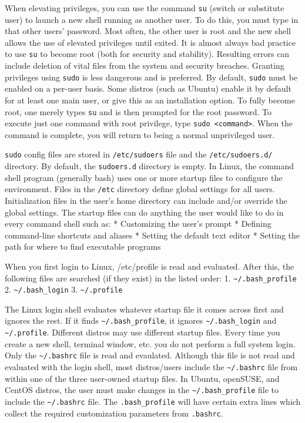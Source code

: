 When elevating privileges, you can use the command \texttt{su} (switch
or substitute user) to launch a new shell running as another user. To do
this, you must type in that other users' password. Most often, the other
user is root and the new shell allows the use of elevated privileges
until exited. It is almost always bad practice to use \texttt{su} to
become root (both for security and stability). Resulting errors can
include deletion of vital files from the system and security breaches.
Granting privileges using \texttt{sudo} is less dangerous and is
preferred. By default, \texttt{sudo} must be enabled on a per-user
basis. Some distros (such as Ubuntu) enable it by default for at least
one main user, or give this as an installation option. To fully become
root, one merely types \texttt{su} and is then prompted for the root
password. To execute just one command with root privilege, type
\texttt{sudo \textless{}command\textgreater{}}. When the command is
complete, you will return to being a normal unprivileged user.

\texttt{sudo} config files are stored in \texttt{/etc/sudoers} file and
the \texttt{/etc/sudoers.d/} directory. By default, the
\texttt{sudoers.d} directory is empty. In Linux, the command shell
program (generally bash) uses one or more startup files to configure the
environment. Files in the \texttt{/etc} directory define global settings
for all users. Initialization files in the user's home directory can
include and/or override the global settings. The startup files can do
anything the user would like to do in every command shell such as: *
Customizing the user's prompt * Defining command-line shortcuts and
aliases * Setting the default text editor * Setting the path for where
to find executable programs

When you first login to Linux, /etc/profile is read and evaluated. After
this, the following files are searched (if they exist) in the listed
order: 1. \texttt{\textasciitilde{}/.bash\_profile} 2.
\texttt{\textasciitilde{}/.bash\_login} 3.
\texttt{\textasciitilde{}/.profile}

The Linux login shell evaluates whatever startup file it comes across
first and ignores the rest. If it finds
\texttt{\textasciitilde{}/.bash\_profile}, it ignores
\texttt{\textasciitilde{}/.bash\_login} and
\texttt{\textasciitilde{}/.profile}. Different distros may use different
startup files. Every time you create a new shell, terminal window, etc.
you do not perform a full system login. Only the
\texttt{\textasciitilde{}/.bashrc} file is read and evaulated. Although
this file is not read and evaluated with the login shell, most
distros/users include the \texttt{\textasciitilde{}/.bashrc} file from
within one of the three user-owned startup files. In Ubuntu, openSUSE,
and CentOS distros, the user must make changes in the
\texttt{\textasciitilde{}/.bash\_profile} file to include the
\texttt{\textasciitilde{}/.bashrc} file. The \texttt{.bash\_profile}
will have certain extra lines which collect the required customization
parameters from \texttt{.bashrc}.

